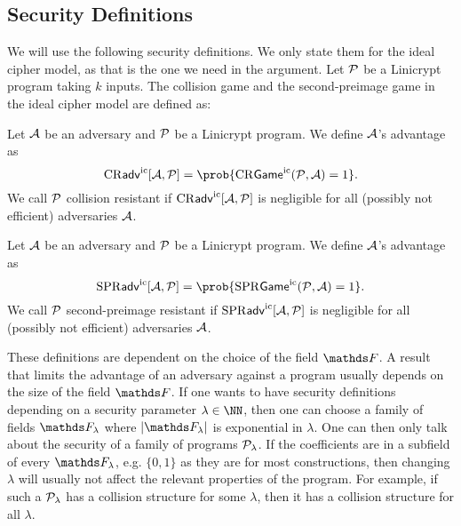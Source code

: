 \subsection{Security Definitions}
We will use the following security definitions.
We only state them for the ideal cipher model,
as that is the one we need in the argument.
Let $\P$ be a Linicrypt program taking $k$ inputs.
The collision game and the second-preimage game in the ideal cipher model are defined as:
\begin{pchstack}[center, space=0.4cm]
\end{pchstack}

\begin{defn}
  Let $\A$ be an adversary and $\P$ be a Linicrypt program.
  We define $\A$'s advantage as 
  \[
    \cradv[\A, \P] = \prob{\crgame(\P, \A) = 1}.
  \]
  We call $\P$ collision resistant if
  $\cradv[\A, \P]$ is negligible for all (possibly not efficient) adversaries $\A$.
\end{defn}

\begin{defn}
  Let $\A$ be an adversary and $\P$ be a Linicrypt program.
  We define $\A$'s advantage as 
  \[
    \spradv[\A, \P] = \prob{\sprgame(\P, \A) = 1}.
  \]
  We call $\P$ second-preimage resistant
  if $\spradv[\A, \P]$ is negligible for all (possibly not efficient) adversaries $\A$.
\end{defn}

These definitions are dependent on the choice of the field $\F$.
A result that limits the advantage of an adversary against a program usually depends on the size of the field $\F$.
If one wants to have security definitions depending on a security parameter $\lambda \in \NN$,
then one can choose a family of fields $\F_\lambda$ where $|\F_\lambda|$ is exponential in $\lambda$.
One can then only talk about the security of a family of programs $\P_\lambda$.
If the coefficients are in a subfield of every $\F_\lambda$,
e.g. $\{0,1\}$ as they are for most constructions,
then changing $\lambda$ will usually not affect the relevant properties of the program.
For example, if such a $\P_\lambda$ has a collision structure for some $\lambda$,
then it has a collision structure for all $\lambda$.
